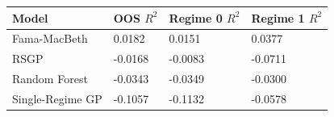 \begin{tabular}{llll}
\hline
Model & OOS $R^2$ & Regime 0 $R^2$ & Regime 1 $R^2$ \\
\hline
Fama-MacBeth & 0.0182 & 0.0151 & 0.0377 \\
RSGP & -0.0168 & -0.0083 & -0.0711 \\
Random Forest & -0.0343 & -0.0349 & -0.0300 \\
Single-Regime GP & -0.1057 & -0.1132 & -0.0578 \\
\hline
\end{tabular}